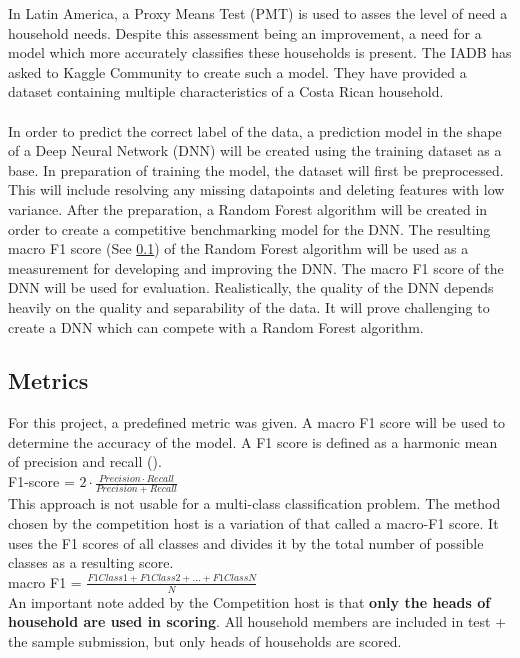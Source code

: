 \documentclass[preprint,12pt]{elsarticle}
\begin{document}
In Latin America, a Proxy Means Test (PMT) is used to asses the level of need a household needs. Despite this assessment being an improvement, a need for a model which more accurately classifies these households is present. The IADB has asked to Kaggle Community to create such a model. They have provided a dataset containing multiple characteristics of a Costa Rican household.
\\
\\
In order to predict the correct label of the data, a prediction model in the shape of a Deep Neural Network (DNN) will be created using the training dataset as a base. In preparation of training the model, the dataset will first be preprocessed. This will include resolving any missing datapoints and deleting features with low variance. After the preparation, a Random Forest algorithm will be created in order to create a competitive benchmarking model for the DNN. The resulting macro F1 score (See \ref{ss:metrics}) of the Random Forest algorithm will be used as a measurement for developing and improving the DNN. The macro F1 score of the DNN will be used for evaluation. Realistically, the quality of the DNN depends heavily on the quality and separability of the data. It will prove challenging to create a DNN which can compete with a Random Forest algorithm.

\subsection{Metrics}
\label{ss:metrics}

For this project, a predefined metric was given. A macro F1 score will be used to determine the accuracy of the model. A F1 score is defined as a harmonic mean of precision and recall (\citet{Yutaka:2007}).\\

F1-score = $2\cdot\frac{Precision \cdot Recall}{Precision + Recall}$\\

This approach is not usable for a multi-class classification problem. The method chosen by the competition host is a variation of that called a macro-F1 score. It uses the F1 scores of all classes and divides it by the total number of possible classes as a resulting score.\\

macro F1 = $\frac{F1Class 1 + F1Class 2 + ... + F1 ClassN}{N}$\\

An important note added by the Competition host is that \textbf{only the heads of household are used in scoring}. All household members are included in test + the sample submission, but only heads of households are scored.
\end{document}
